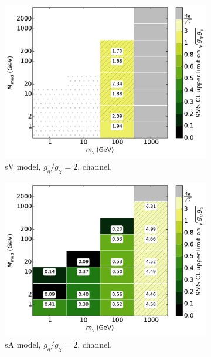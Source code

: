 \begin{figure}
\begin{subfigure}[t]{0.32\textwidth}
    \centering
    \includegraphics[width=1.\textwidth]{figures/grid_basepoints_SVD_rat2_monoWZ.pdf}
    \caption{sV model, $g_q/g_{\chi} = 2$, \monoWZ channel.}
    \vspace{0.75cm}
  \end{subfigure}
  \begin{subfigure}[t]{0.32\textwidth}
    \centering
    \includegraphics[width=1.\textwidth]{figures/grid_basepoints_SVD_rat2_monojet.pdf} %
    \caption{sA model, $g_q/g_{\chi} = 2$, \monojet channel.}
  \end{subfigure}
  \begin{subfigure}[t]{0.32\textwidth}
    \centering

\end{subfigure}
\end{figure}
